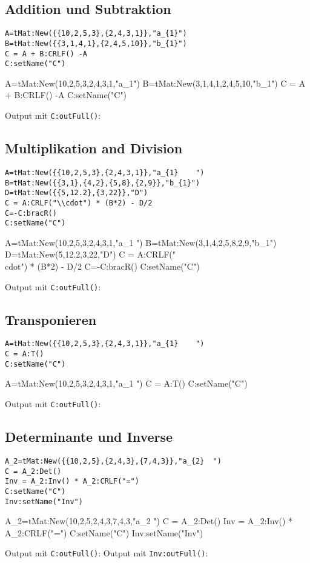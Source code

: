 \subsection{Addition und Subtraktion}
\begin{lstlisting}
A=tMat:New({{10,2,5,3},{2,4,3,1}},"a_{1}")
B=tMat:New({{3,1,4,1},{2,4,5,10}},"b_{1}")
C = A + B:CRLF() -A
C:setName("C")
\end{lstlisting}
\begin{luacode*}
A=tMat:New({{10,2,5,3},{2,4,3,1}},"a_{1}")
B=tMat:New({{3,1,4,1},{2,4,5,10}},"b_{1}")
C = A + B:CRLF() -A
C:setName("C")
\end{luacode*}
Output mit \lstinline{C:outFull()}:
\subsection{Multiplikation and Division}
\begin{lstlisting}
A=tMat:New({{10,2,5,3},{2,4,3,1}},"a_{1}	")
B=tMat:New({{3,1},{4,2},{5,8},{2,9}},"b_{1}")
D=tMat:New({{5,12.2},{3,22}},"D")	
C = A:CRLF("\\cdot") * (B*2) - D/2
C=-C:bracR()
C:setName("C")
\end{lstlisting}
\begin{luacode*}
A=tMat:New({{10,2,5,3},{2,4,3,1}},"a_{1}	")
B=tMat:New({{3,1},{4,2},{5,8},{2,9}},"b_{1}")
D=tMat:New({{5,12.2},{3,22}},"D")	
C = A:CRLF("\\cdot") * (B*2) - D/2
C=-C:bracR()
C:setName("C")
\end{luacode*}
Output mit \lstinline{C:outFull()}:
\subsection{Transponieren}
\begin{lstlisting}
A=tMat:New({{10,2,5,3},{2,4,3,1}},"a_{1}	")
C = A:T()
C:setName("C")
\end{lstlisting}
\begin{luacode*}
A=tMat:New({{10,2,5,3},{2,4,3,1}},"a_{1}	")
C = A:T()
C:setName("C")
\end{luacode*}
Output mit \lstinline{C:outFull()}:
\subsection{Determinante und Inverse}
\begin{lstlisting}
A_2=tMat:New({{10,2,5},{2,4,3},{7,4,3}},"a_{2}	")
C = A_2:Det()
Inv = A_2:Inv() * A_2:CRLF("=")
C:setName("C")
Inv:setName("Inv")
\end{lstlisting}
\begin{luacode*}
A_2=tMat:New({{10,2,5},{2,4,3},{7,4,3}},"a_{2}	")
C = A_2:Det()
Inv = A_2:Inv() * A_2:CRLF("=")
C:setName("C")
Inv:setName("Inv")
\end{luacode*}
Output mit \lstinline{C:outFull()}:
Output mit \lstinline{Inv:outFull()}:
